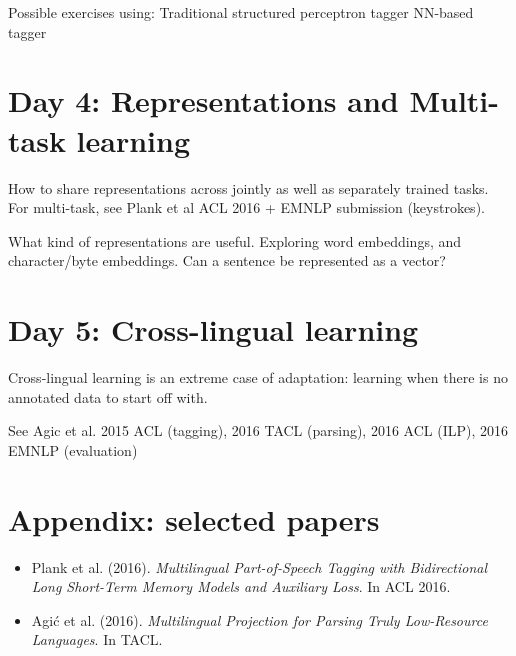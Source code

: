 \documentclass{article}
\begin{document}
Possible exercises using:
Traditional structured perceptron tagger 
NN-based tagger 


\section{Day 4: Representations and Multi-task learning}


How to share representations across jointly as well as separately trained tasks. For multi-task, see Plank et al ACL 2016 + EMNLP submission (keystrokes).

What kind of representations are useful. Exploring word embeddings, and character/byte embeddings. Can a sentence be represented as a vector?



\section{Day 5: Cross-lingual learning}

Cross-lingual learning is an extreme case of adaptation: learning when there is no annotated data to start off with.


See Agic et al. 2015 ACL (tagging), 2016 TACL (parsing), 2016 ACL (ILP), 2016 EMNLP (evaluation)

\clearpage
{}
\section{Appendix: selected papers}

\begin{itemize}
\item Plank et al. (2016). \textit{Multilingual Part-of-Speech Tagging with Bidirectional Long Short-Term Memory Models and Auxiliary Loss}. In ACL 2016.
\item Agić et al. (2016). \textit{Multilingual Projection for Parsing Truly Low-Resource Languages}. In TACL.
\end{itemize}
 
 




\end{document}
